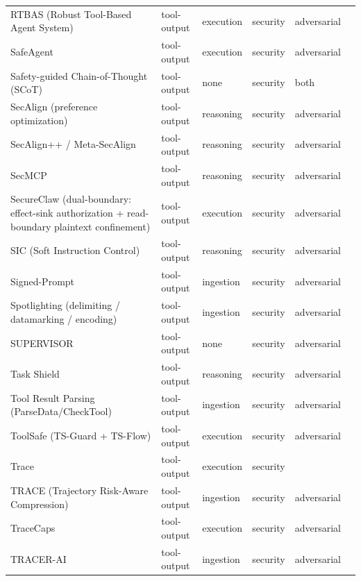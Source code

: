 \begin{longtable}{@{}p{}lllll@{}}
RTBAS (Robust Tool-Based Agent System) & tool-output & execution & security & adversarial & \cite{zhong-2025-rtbas} \\
SafeAgent & tool-output & execution & security & adversarial & \cite{liu-2026-safeagent} \\
Safety-guided Chain-of-Thought (SCoT) & tool-output & none & security & both & \cite{lee-2024-mobilesafetybench} \\
SecAlign (preference optimization) & tool-output & reasoning & security & adversarial & \cite{chen-2024-secalign} \\
SecAlign++ / Meta-SecAlign & tool-output & reasoning & security & adversarial & \cite{chen-2025-meta} \\
SecMCP & tool-output & reasoning & security & adversarial & \cite{shi-2025-quantifying} \\
SecureClaw (dual-boundary: effect-sink authorization + read-boundary plaintext confinement) & tool-output & execution & security & adversarial & \cite{ma-2026-secureclaw} \\
SIC (Soft Instruction Control) & tool-output & reasoning & security & adversarial & \cite{walter-2025-soft} \\
Signed-Prompt & tool-output & ingestion & security & adversarial & \cite{suo-2024-signedprompt} \\
Spotlighting (delimiting / datamarking / encoding) & tool-output & ingestion & security & adversarial & \cite{hines-2024-defending} \\
SUPERVISOR & tool-output & none & security & adversarial & \cite{wu-2026-bots} \\
Task Shield & tool-output & reasoning & security & adversarial & \cite{jia-2024-task} \\
Tool Result Parsing (ParseData/CheckTool) & tool-output & ingestion & security & adversarial & \cite{yu-2026-defense} \\
ToolSafe (TS-Guard + TS-Flow) & tool-output & execution & security & adversarial & \cite{mou-2026-toolsafe} \\
Trace & tool-output & execution & security &  & \cite{ediga-2026-trace} \\
TRACE (Trajectory Risk-Aware Compression) & tool-output & ingestion & security & adversarial & \cite{hong-2026-trace} \\
TraceCaps & tool-output & execution & security & adversarial & \cite{catarino-2026-tracecaps} \\
TRACER-AI & tool-output & ingestion & security & adversarial & \cite{singh-2026-tracerai} \\

\end{longtable}
